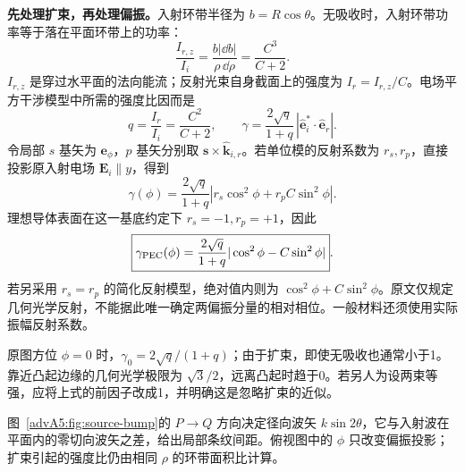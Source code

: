 \begin{advsolution}
\textbf{先处理扩束，再处理偏振。}入射环带半径为 $b=R\cos\theta$。无吸收时，入射环带功率等于落在平面环带上的功率：
\[
 \frac{I_{r,z}}{I_i}=\frac{b|\dd b|}{\rho\,\dd\rho}=\frac{C^3}{C+2}.
\]
$I_{r,z}$ 是穿过水平面的法向能流；反射光束自身截面上的强度为 $I_r=I_{r,z}/C$。电场平方干涉模型中所需的强度比因而是
\[
 q=\frac{I_r}{I_i}=\frac{C^2}{C+2},\qquad
 \gamma=\frac{2\sqrt q}{1+q}\,|\hat{\boldsymbol e}_i^*\!\cdot\hat{\boldsymbol e}_r|.
\]
令局部 $s$ 基矢为 $\boldsymbol e_\phi$，$p$ 基矢分别取 $\boldsymbol s\times\hat{\boldsymbol k}_{i,r}$。若单位模的反射系数为 $r_s,r_p$，直接投影原入射电场 $\boldsymbol E_i\parallel y$，得到
\[
 \boxed{\gamma(\phi)=\frac{2\sqrt q}{1+q}
 \left|r_s\cos^2\phi+r_p C\sin^2\phi\right|}.
\]
理想导体表面在这一基底约定下 $r_s=-1,r_p=+1$，因此
\[
 \boxed{\gamma_{\rm PEC}(\phi)=\frac{2\sqrt q}{1+q}
       |\cos^2\phi-C\sin^2\phi|}.
\]
若另采用 $r_s=r_p$ 的简化反射模型，绝对值内则为 $\cos^2\phi+C\sin^2\phi$。原文仅规定几何光学反射，不能据此唯一确定两偏振分量的相对相位。一般材料还须使用实际振幅反射系数。

原图方位 $\phi=0$ 时，$\gamma_0=2\sqrt q/(1+q)$；由于扩束，即使无吸收也通常小于1。靠近凸起边缘的几何光学极限为 $\sqrt3/2$，远离凸起时趋于0。若另人为设两束等强，应将上式的前因子改成1，并明确这是忽略扩束的近似。

图~\ref{advA5:fig:source-bump}的 $P\to Q$ 方向决定径向波矢 $k\sin2\theta$，它与入射波在平面内的零切向波矢之差，给出局部条纹间距。俯视图中的 $\phi$ 只改变偏振投影；扩束引起的强度比仍由相同 $\rho$ 的环带面积比计算。
\end{advsolution}

